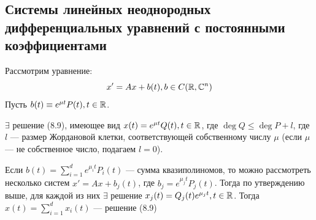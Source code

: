 \subsection{Системы линейных неоднородных дифференциальных уравнений с постоянными коэффициентами}
Рассмотрим уравнение:
\begin{equation}
    x' = Ax + b(t), b \in C(\mathbb{R}, \mathbb{C}^n)
\end{equation}
Пусть \(b(t) \equiv e^{\mu t}P(t), t \in \mathbb{R}\).
\begin{proposition}[(б/д)]
    \(\exists\) решение (8.9), имеющее вид \(x(t) = e^{\mu t}Q(t), t \in \mathbb{R}\), где \(\deg Q \le \deg P + l\), где \(l\) --- размер Жордановой клетки, соответствующей собственному числу \(\mu\) (если \(\mu\) --- не собственное число, подагаем \(l = 0\)).
\end{proposition}

Если \(b(t) = \sum_{i = 1}^d e^{\mu_it}P_i(t)\) --- сумма квазиполиномов, то можно рассмотреть несколько систем \(x' = Ax + b_j(t)\), где \(b_j = e^{\mu_jt}P_j(t)\). Тогда по утверждению выше, для каждой из них \(\exists\) решение \(x_j(t) = Q_j(t)e^{\mu_j t}, t \in \mathbb{R}\). Тогда \(x(t) = \sum_{i = 1}^d x_i(t)\) --- решение (8.9)
